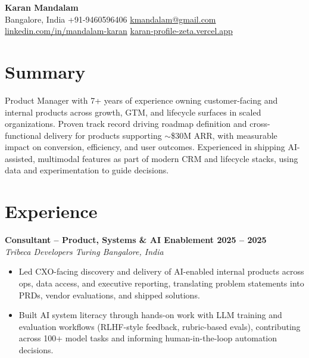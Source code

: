 \documentclass[10pt,a4paper]{article}
\begin{document}
\fontsize{10pt}{11.5pt}\selectfont

\begin{center}
{\LARGE \textbf{Karan Mandalam}} \\[4pt]
Bangalore, India \textbar{} +91-9460596406 \textbar{} \href{mailto:kmandalam@gmail.com}{kmandalam@gmail.com} \\
\href{https://linkedin.com/in/mandalam-karan}{linkedin.com/in/mandalam-karan} \textbar{} \href{https://karan-profile-zeta.vercel.app}{karan-profile-zeta.vercel.app}
\end{center}

\section*{Summary}
Product Manager with 7+ years of experience owning customer-facing and internal products across growth, GTM, and lifecycle surfaces in scaled organizations. Proven track record driving roadmap definition and cross-functional delivery for products supporting $\sim$\$30M ARR, with measurable impact on conversion, efficiency, and user outcomes. Experienced in shipping AI-assisted, multimodal features as part of modern CRM and lifecycle stacks, using data and experimentation to guide decisions.

\section*{Experience}

\textbf{Consultant -- Product, Systems \& AI Enablement \textbar{} 2025 -- 2025} \\
\textit{Tribeca Developers \textbar{} Turing \textbar{} Bangalore, India}
\begin{itemize}
  \item Led CXO-facing discovery and delivery of AI-enabled internal products across ops, data access, and executive reporting, translating problem statements into PRDs, vendor evaluations, and shipped solutions.
  \item Built AI system literacy through hands-on work with LLM training and evaluation workflows (RLHF-style feedback, rubric-based evals), contributing across 100+ model tasks and informing human-in-the-loop automation decisions.
\end{itemize}
\end{document}
